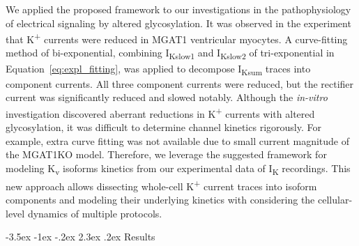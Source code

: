 \documentclass[11pt]{article}
\makeatletter
\renewcommand\section{\@startsection {section}{1}{\z@}%
                                   {-3.5ex \@plus -1ex \@minus -.2ex}%
                                   {2.3ex \@plus.2ex}%
                                   {\normalfont\fontfamily{phv}\fontsize{16}{19}\bfseries}}
\makeatother
\begin{document}
We applied the proposed framework to our investigations in the pathophysiology of electrical signaling by altered glycosylation. It was observed in the experiment that K\textsuperscript{+} currents were reduced in MGAT1 ventricular myocytes. A curve-fitting method of bi-exponential, combining I\textsubscript{Kslow1} and I\textsubscript{Kslow2} of tri-exponential in Equation~\ref{eq:expl_fitting}, was applied to decompose I\textsubscript{Ksum} traces into component currents. All three component currents were reduced, but the rectifier current was significantly reduced and slowed notably. Although the \textit{in-vitro} investigation discovered aberrant reductions in K\textsuperscript{+} currents with altered glycosylation, it was difficult to determine channel kinetics rigorously. For example, extra curve fitting was not available due to small current magnitude of the MGAT1KO model. Therefore, we leverage the suggested framework for modeling K\textsubscript{v} isoforms kinetics from our experimental data of I\textsubscript{K} recordings. This new approach allows dissecting whole-cell K\textsuperscript{+} current traces into isoform components and modeling their underlying kinetics with considering the cellular-level dynamics of multiple protocols.

\section{Results}
\end{document}
